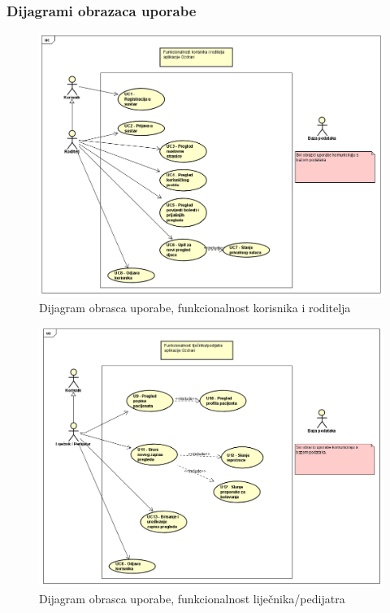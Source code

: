 			
					
				\subsubsection{Dijagrami obrazaca uporabe}
					
				\begin{figure}[H]
					\includegraphics[scale=0.6]{dijagrami/UCRoditelj.PNG}
					\centering
					\caption{Dijagram obrasca uporabe, funkcionalnost korisnika i roditelja}
					\label{fig:myChart}
				\end{figure}
				
				\begin{figure}[H]
					\includegraphics[scale=0.6]{dijagrami/UCLijecnikPedijatar.PNG}
					\centering
					\caption{Dijagram obrasca uporabe, funkcionalnost liječnika/pedijatra}
					\label{fig:myChart}
				\end{figure}
				
